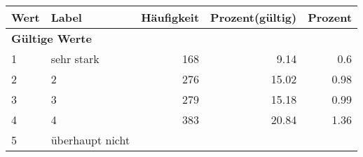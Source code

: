      \begin{longtable}{lXrrr}
     \toprule
     \textbf{Wert} & \textbf{Label} & \textbf{Häufigkeit} & \textbf{Prozent(gültig)} & \textbf{Prozent} \\
     \endhead
     \midrule
     \multicolumn{5}{l}{\textbf{Gültige Werte}}\\

     1 &
     \multicolumn{1}{X}{ sehr stark   } &


       \num{168} &
       \num[round-mode=places,round-precision=2]{9,14} &
         \num[round-mode=places,round-precision=2]{0,6} \\

     2 &
     \multicolumn{1}{X}{ 2   } &


       \num{276} &
       \num[round-mode=places,round-precision=2]{15,02} &
         \num[round-mode=places,round-precision=2]{0,98} \\

     3 &
     \multicolumn{1}{X}{ 3   } &


       \num{279} &
       \num[round-mode=places,round-precision=2]{15,18} &
         \num[round-mode=places,round-precision=2]{0,99} \\

     4 &
     \multicolumn{1}{X}{ 4   } &


       \num{383} &
       \num[round-mode=places,round-precision=2]{20,84} &
         \num[round-mode=places,round-precision=2]{1,36} \\

     5 &
     \multicolumn{1}{X}{ überhaupt nicht   } &



\end{longtable}
